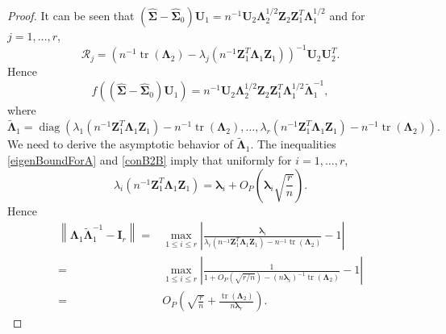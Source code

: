 \documentclass[12pt]{article} %
\DeclareMathOperator{\mytr}{tr}
\DeclareMathOperator{\mydiag}{diag}
\newcommand{\bZ}{\mathbf{Z}}
\newcommand{\bI}{\mathbf{I}}
\newcommand{\bU}{\mathbf{U}}
\newcommand{\bfsym}[1]{\ensuremath{\boldsymbol{#1}}}
\def\blambda {\bfsym {\lambda}}
\def\bLambda {\bfsym {\Lambda}}
\def\bSigma {\bfsym {\Sigma}}
\theoremstyle{definition}
\begin{document}
\begin{appendices}
\begin{proof}
    It can be seen that 
$(\hat{\bSigma}-\hat{\bSigma}_0)\bU_1 = n^{-1} \bU_2 \bLambda_2^{1/2} \bZ_2 \bZ_1^T \bLambda_1^{1/2}$
and  for $j=1,\ldots, r$,
    \begin{equation*}
        \mathcal{R}_j=\left(n^{-1}\mytr(\bLambda_2)-\lambda_j(n^{-1}\bZ_1^T \bLambda_1 \bZ_1)\right)^{-1} \bU_2 \bU_2^T.
    \end{equation*}
    Hence
    \begin{equation*}
                f(
                    (\hat{\bSigma}-\hat{\bSigma}_0) \bU_{1}
                )
                =
                n^{-1} \bU_2 \bLambda_2^{1/2} \bZ_2 \bZ_1^T \bLambda_1^{1/2} \tilde{\bLambda}_1^{-1},
    \end{equation*}
    where
    \begin{equation*}
        \tilde{\bLambda}_1 = \mydiag\left(\lambda_1(n^{-1}\bZ_1^T \bLambda_1 \bZ_1)-n^{-1}\mytr(\bLambda_2), \ldots, \lambda_r(n^{-1}\bZ_1^T \bLambda_1 \bZ_1)-n^{-1}\mytr(\bLambda_2)\right).
    \end{equation*}
    We need to derive the asymptotic behavior of $\tilde{\bLambda}_1$.
    The inequalities \eqref{eigenBoundForA}  and \eqref{conB2B} imply that
    uniformly for $i=1,\ldots, r$,
    \begin{equation*}
        \lambda_i(n^{-1}\bZ_1^T \bLambda_1 \bZ_1)
        =\blambda_i+O_P\left(\blambda_i \sqrt{\frac{r}{n}}\right).
    \end{equation*}
    Hence
    \begin{equation*}
        \begin{split}
            \left\|\bLambda_1\tilde{\bLambda}_1^{-1}- \bI_r\right\|
=&
\max_{1\leq i\leq r}\left|
    \frac{\blambda_i}{\lambda_i(n^{-1}\bZ_1^T \bLambda_1 \bZ_1)-n^{-1}\mytr(\bLambda_2)}
    -
    1
    \right|
\\
=&
\max_{1\leq i\leq r}\left|
\frac{1}{1+O_P(\sqrt{r/n})-(n\blambda_{i})^{-1}\mytr(\bLambda_2)}
    -
    1
\right|
\\
=& 
O_P\left(\sqrt{\frac{r}{n}}
    +\frac{\mytr(\bLambda_2)}{n\blambda_r}
    \right)
    .
        \end{split}
    \end{equation*}

\end{proof}
\end{appendices}
\end{document}

